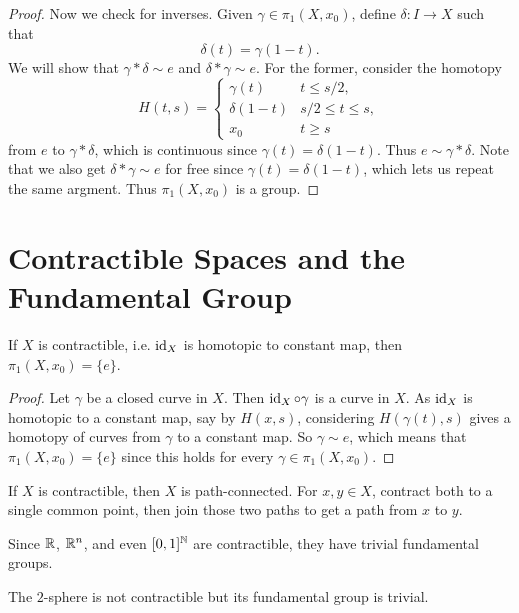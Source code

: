 \begin{proof}
  Now we check for inverses. Given
  $\gamma \in \pi_1(X, x_0)$, define
  $\delta : I \to X$ such that
  \[
    \delta(t) = \gamma(1 - t).
  \]
  We will show that $\gamma * \delta \sim e$ and
  $\delta * \gamma \sim e$. For the former, consider
  the homotopy
  \[
    H(t, s) =
    \begin{cases}
      \gamma(t) & t \le s / 2, \\
      \delta(1 - t) & s / 2 \le t \le s, \\
      x_0 & t \ge s
    \end{cases}
  \]
  from $e$ to $\gamma * \delta$, which is
  continuous since $\gamma(t) = \delta(1 - t)$.
  Thus $e \sim \gamma * \delta$. Note that we also
  get $\delta * \gamma \sim e$ for free since
  $\gamma(t) = \delta(1 - t)$, which lets us
  repeat the same argment.
  Thus $\pi_1(X, x_0)$ is a group.
\end{proof}

\section{Contractible Spaces and the Fundamental Group}

\begin{lemma}
  If $X$ is contractible, i.e. $\operatorname{id}_X$ is homotopic
  to constant map, then $\pi_1(X, x_0) = \{e\}$.
\end{lemma}

\begin{proof}
  Let $\gamma$ be a closed curve in $X$. Then
  $\operatorname{id}_X \circ \gamma$ is a curve in $X$. As
  $\operatorname{id}_X$ is homotopic to a constant map, say by
  $H(x, s)$,
  considering $H(\gamma(t), s)$ gives a homotopy
  of curves from $\gamma$ to a constant map. So
  $\gamma \sim e$, which means that
  $\pi_1(X, x_0) = \{e\}$ since this holds for
  every $\gamma \in \pi_1(X, x_0)$.
\end{proof}

\begin{remark}
  If $X$ is contractible, then $X$ is path-connected.
  For $x, y \in X$, contract both to a single common
  point, then join those two paths to get a path from
  $x$ to $y$.
\end{remark}

\begin{remark}
  Since $\mathbb{R}$, $\mathbb{R}^n$, and even $[0, 1]^{\mathbb{N}}$ are
  contractible, they have trivial fundamental groups.
\end{remark}

\begin{remark}
  The $2$-sphere is not contractible but its
  fundamental group is trivial.
\end{remark}
